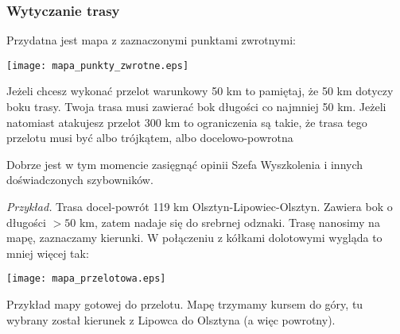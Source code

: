 \documentclass{article}
\begin{document}
\subsubsection{Wytyczanie trasy}
Przydatna jest mapa z zaznaczonymi punktami zwrotnymi:
\begin{center}
\texttt{[image: mapa\_punkty\_zwrotne.eps]}
\end{center}
Jeżeli chcesz wykonać przelot warunkowy 50 km to pamiętaj, że 50 km dotyczy
boku trasy. Twoja trasa musi zawierać bok długości co najmniej 50 km.
Jeżeli natomiast atakujesz przelot 300 km to ograniczenia są takie, że
trasa tego przelotu musi być albo trójkątem, albo docelowo-powrotna

Dobrze jest w tym momencie zasięgnąć opinii Szefa Wyszkolenia i innych
doświadczonych szybowników.

\textit{Przykład.} Trasa docel-powrót 119 km Olsztyn-Lipowiec-Olsztyn.
Zawiera bok o długości $> 50$ km, zatem nadaje się do srebrnej odznaki.
Trasę nanosimy na mapę, zaznaczamy kierunki. W połączeniu z kółkami
dolotowymi wygląda to mniej więcej tak:
\begin{center}
\texttt{[image: mapa\_przelotowa.eps]}
\end{center}

\noindent
Przykład mapy gotowej do przelotu. Mapę trzymamy kursem do góry, tu
wybrany został kierunek z Lipowca do Olsztyna (a więc powrotny).


\newpage
\end{document}
